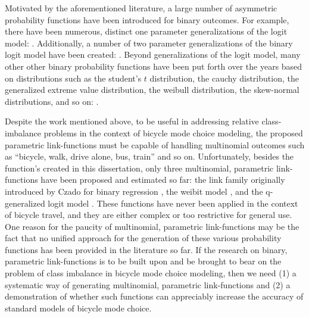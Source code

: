 \documentclass{article}
\begin{document}
Motivated by the aforementioned literature, a large number of asymmetric probability functions have been introduced for binary outcomes. For example, there have been numerous, distinct one parameter generalizations of the logit model: \citep{aranda-ordaz_two_1981, guerrero_use_1982, czado_link_1992, nagler_scobit:_1994, chen_new_1999, masnadi-shirazi_variable_2010, nakayama_unified_2015, komori_asymmetric_2015}. Additionally, a number of two parameter generalizations of the binary logit model have been created: \citep{prentice_generalization_1976, pregibon_goodness_1980, stukel_generalized_1988, czado_parametric_1994, vijverberg_betit:_2000, vijverberg_pregibit:_2012}. Beyond generalizations of the logit model, many other other binary probability functions have been put forth over the years based on distributions such as the student's $t$ distribution, the cauchy distribution, the generalized extreme value distribution, the weibull distribution, the skew-normal distributions, and so on: \citep{kim_binary_2002, liu_robit_2004, castillo_closed_2008, kim_flexible_2008, koenker_parametric_2009, wang_generalized_2010, li_multinomial_2011, jiang_new_2013}. 

Despite the work mentioned above, to be useful in addressing relative class-imbalance problems in the context of bicycle mode choice modeling, the proposed parametric link-functions must be capable of handling multinomial outcomes such as ``bicycle, walk, drive alone, bus, train'' and so on. Unfortunately, besides the function's created in this dissertation, only three multinomial, parametric link-functions have been proposed and estimated so far:  the link family originally introduced by Czado for binary regression \citep{das_generalized_2014}, the weibit model \citep{castillo_closed_2008, fosgerau_discrete_2009}, and the q-generalized logit model \citep{nakayama_unified_2015}. These functions have never been applied in the context of bicycle travel, and they are either complex or too restrictive for general use. One reason for the paucity of multinomial, parametric link-functions may be the fact that no unified approach for the generation of these various probability functions has been provided in the literature so far. If the research on binary, parametric link-functions is to be built upon and be brought to bear on the problem of class imbalance in bicycle mode choice modeling, then we need (1) a systematic way of generating multinomial, parametric link-functions and (2) a demonstration of whether such functions can appreciably increase the accuracy of standard models of bicycle mode choice.
\end{document}

